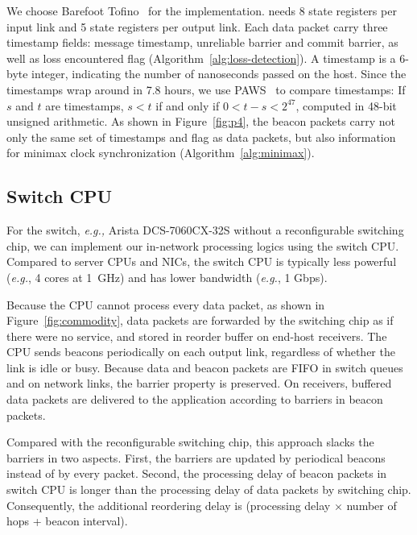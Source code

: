 We choose Barefoot Tofino~\cite{tofino} for the implementation. \sys needs 8 state registers per input link and 5 state registers per output link. Each data packet carry three timestamp fields: message timestamp, unreliable barrier and commit barrier, as well as loss encountered flag (Algorithm~\ref{alg:loss-detection}).
A timestamp is a 6-byte integer, indicating the number of nanoseconds passed on the host. Since the timestamps wrap around in 7.8 hours, we use PAWS~\cite{jacobson1992tcp} to compare timestamps: If $s$ and $t$ are timestamps, $s < t$ if and only if $0 < t - s < 2^{47}$, computed in 48-bit unsigned arithmetic. As shown in Figure~\ref{fig:p4}, the beacon packets carry not only the same set of timestamps and flag as data packets, but also information for minimax clock synchronization (Algorithm~\ref{alg:minimax}).

\subsection{Switch CPU}
\label{sec:commodity}

For the switch, \textit{e.g.,} Arista DCS-7060CX-32S without a reconfigurable switching chip, we can implement our in-network processing logics using the switch CPU. 
Compared to server CPUs and NICs, the switch CPU is typically less powerful (\textit{e.g.}, 4 cores at 1~GHz) and has lower bandwidth (\textit{e.g.}, 1 Gbps).

Because the CPU cannot process every data packet, as shown in Figure~\ref{fig:commodity}, data packets are forwarded by the switching chip as if there were no \sys service, and stored in reorder buffer on end-host receivers.
The CPU sends beacons periodically on each output link, regardless of whether the link is idle or busy.
Because data and beacon packets are FIFO in switch queues and on network links, the barrier property is preserved. On receivers, buffered data packets are delivered to the application according to barriers in beacon packets.

Compared with the reconfigurable switching chip, this approach slacks the barriers in two aspects.
First, the barriers are updated by periodical beacons instead of by every packet.
Second, the processing delay of beacon packets in switch CPU is longer than the processing delay of data packets by switching chip.
Consequently, the additional reordering delay is (processing delay $\times$ number of hops + beacon interval).

